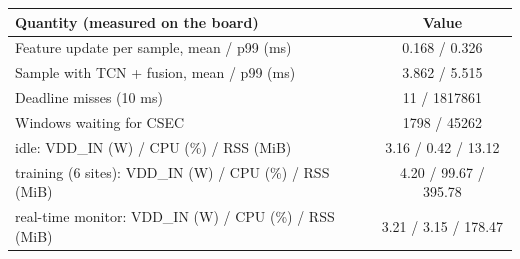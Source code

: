 \begin{tabular}{lc}
\hline
Quantity (measured on the board) & Value \\
\hline
Feature update per sample, mean / p99 (ms) & 0.168 / 0.326 \\
Sample with TCN + fusion, mean / p99 (ms) & 3.862 / 5.515 \\
Deadline misses (10 ms) & 11 / 1817861 \\
Windows waiting for CSEC & 1798 / 45262 \\
idle: VDD\_IN (W) / CPU (\%) / RSS (MiB) & 3.16 / 0.42 / 13.12 \\
training (6 sites): VDD\_IN (W) / CPU (\%) / RSS (MiB) & 4.20 / 99.67 / 395.78 \\
real-time monitor: VDD\_IN (W) / CPU (\%) / RSS (MiB) & 3.21 / 3.15 / 178.47 \\
\hline
\end{tabular}

